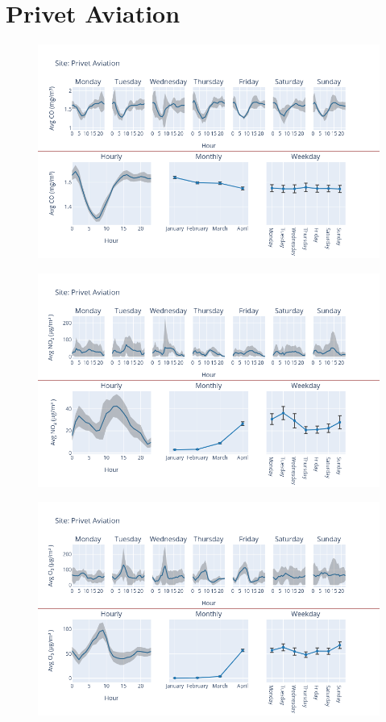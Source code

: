 \documentclass[12pt, oneside]{book}
\begin{document}
{\section{Privet Aviation}
{\begin{figure}[H] 
 \centering 
\includegraphics[width=.88\textwidth, keepaspectratio]{image110} 
 \end{figure}}{} 

{\begin{figure}[H] 
 \centering 
\includegraphics[width=.88\textwidth, keepaspectratio]{image111} 
 \end{figure}}{} 

{\begin{figure}[H] 
 \centering 
\includegraphics[width=.88\textwidth, keepaspectratio]{image112} 
 \end{figure}}{} 

}
\end{document}
